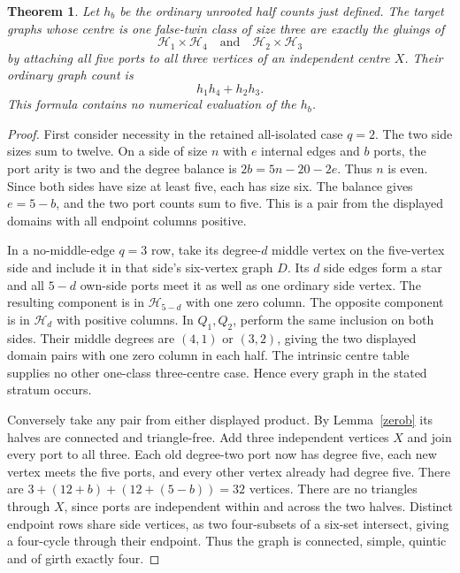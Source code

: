 \documentclass[11pt]{article}
\newtheorem{theorem}{Theorem}
\begin{document}
\begin{theorem}\label{threecentre}
Let $h_b$ be the ordinary unrooted half counts just defined. The target
graphs whose centre is one false-twin class of size three are exactly
the gluings of
\[
 \mathcal H_1\times\mathcal H_4
 \quad\text{and}\quad
 \mathcal H_2\times\mathcal H_3
\]
by attaching all five ports to all three vertices of an independent
centre $X$. Their ordinary graph count is
\begin{equation}\label{threecount}
 h_1h_4+h_2h_3.
\end{equation}
This formula contains no numerical evaluation of the $h_b$.
\end{theorem}
\begin{proof}
First consider necessity in the retained all-isolated case $q=2$.
The two side sizes sum to twelve. On a side of size $n$ with $e$
internal edges and $b$ ports, the port arity is two and the degree
balance is $2b=5n-20-2e$. Thus $n$ is even. Since both sides have
size at least five, each has size six. The balance gives $e=5-b$,
and the two port counts sum to five. This is a pair from the displayed
domains with all endpoint columns positive.

In a no-middle-edge $q=3$ row, take its degree-$d$ middle vertex on
the five-vertex side and include it in that side's six-vertex graph
$D$. Its $d$ side edges form a star and all $5-d$ own-side ports meet
it as well as one ordinary side vertex. The resulting component is
in $\mathcal H_{5-d}$ with one zero column. The opposite component
is in $\mathcal H_d$ with positive columns. In $Q_1,Q_2$, perform
the same inclusion on both sides. Their middle degrees are $(4,1)$
or $(3,2)$, giving the two displayed domain pairs with one zero column
in each half. The intrinsic centre table supplies no other one-class
three-centre case. Hence every graph in the stated stratum occurs.

Conversely take any pair from either displayed product. By
Lemma~\ref{zerob} its halves are connected and triangle-free. Add
three independent vertices $X$ and join every port to all three.
Each old degree-two port now has degree five, each new vertex meets
the five ports, and every other vertex already had degree five.
There are $3+(12+b)+(12+(5-b))=32$ vertices. There are no triangles
through $X$, since ports are independent within and across the two
halves. Distinct endpoint rows share side vertices, as two four-subsets
of a six-set intersect, giving a four-cycle through their endpoint.
Thus the graph is connected, simple, quintic and of girth exactly four.


\end{proof}
\end{document}
